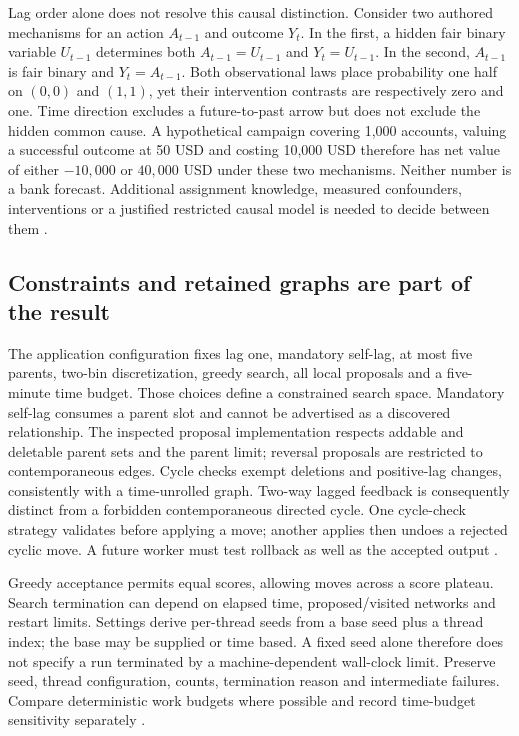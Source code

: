 Lag order alone does not resolve this causal distinction. Consider two
authored mechanisms for an action $A_{t-1}$ and outcome $Y_t$. In the first,
a hidden fair binary variable $U_{t-1}$ determines both
$A_{t-1}=U_{t-1}$ and $Y_t=U_{t-1}$. In the second,
$A_{t-1}$ is fair binary and $Y_t=A_{t-1}$. Both observational laws place
probability one half on $(0,0)$ and $(1,1)$, yet their intervention contrasts
are respectively zero and one. Time direction excludes a future-to-past
arrow but does not exclude the hidden common cause. A hypothetical campaign
covering 1,000 accounts, valuing a successful outcome at 50 USD and costing
10,000 USD therefore has net value of either $-10{,}000$ or $40{,}000$ USD
under these two mechanisms. Neither number is a bank forecast. Additional
assignment knowledge, measured confounders, interventions or a justified
restricted causal model is needed to decide between them
\cite{exec24_banjo_choice}.

\subsection{Constraints and retained graphs are part of the result}
The application configuration fixes lag one, mandatory self-lag, at most five
parents, two-bin discretization, greedy search, all local proposals and a
five-minute time budget. Those choices define a constrained search space.
Mandatory self-lag consumes a parent slot and cannot be advertised as a
discovered relationship. The inspected proposal implementation respects
addable and deletable parent sets and the parent limit; reversal proposals
are restricted to contemporaneous edges. Cycle checks exempt deletions and
positive-lag changes, consistently with a time-unrolled graph. Two-way lagged
feedback is consequently distinct from a forbidden contemporaneous directed
cycle. One cycle-check strategy validates before applying a move; another
applies then undoes a rejected cyclic move. A future worker must test rollback
as well as the accepted output \cite{exec24_banjo_source}.

Greedy acceptance permits equal scores, allowing moves across a score
plateau. Search termination can depend on elapsed time, proposed/visited
networks and restart limits. Settings derive per-thread seeds from a base
seed plus a thread index; the base may be supplied or time based. A fixed
seed alone therefore does not specify a run terminated by a machine-dependent
wall-clock limit. Preserve seed, thread configuration, counts, termination
reason and intermediate failures. Compare deterministic work budgets where
possible and record time-budget sensitivity separately
\cite{exec24_banjo_source}.


